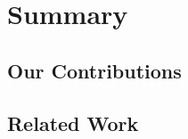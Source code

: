 \documentclass[conference,12pt]{IEEEtran}
\begin{document}


\section{Summary}


\subsection{Our Contributions}
\subsection{Related Work}
\end{document}
